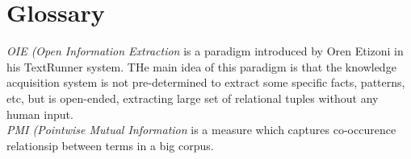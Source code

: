 % 
\chapter{Glossary}

\emph{OIE (Open Information Extraction} is a paradigm introduced by Oren Etizoni in his TextRunner system. THe main idea of this paradigm is that the knowledge acquisition system is not pre-determined to extract some specific facts, patterns, etc, but is open-ended, extracting large set of relational tuples without any human input.\\
\emph{PMI (Pointwise Mutual Information} is a measure which captures 
co-occurence relationsip between terms in a big corpus.\\
